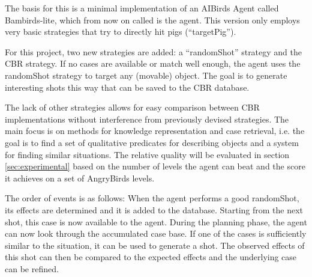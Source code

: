 The basis for this is a minimal implementation of an AIBirds Agent called Bambirds-lite, which from now on called is the agent.
This version only employs very basic strategies that try to directly hit pigs (``targetPig'').

For this project, two new strategies are added: a ``randomShot'' strategy and the CBR strategy.
If no cases are available or match well enough, the agent uses the randomShot strategy to target any (movable) object. The goal is to generate interesting shots this way that can be saved to the \ac{CBR} database.

The lack of other strategies allows for easy comparison between CBR implementations without interference from previously devised strategies.
The main focus is on methods for knowledge representation and case retrieval, i.e. the goal is to find a set of qualitative predicates for describing objects and a system for finding similar situations.
The relative quality will be evaluated in section \ref{sec:experimental} based on the number of levels the agent can beat and the score it achieves on a set of AngryBirds levels.

The order of events is as follows:
When the agent performs a good randomShot, its effects are determined and it is added to the database. Starting from the next shot, this case is now available to the agent.
During the planning phase, the agent can now look through the accumulated case base.
If one of the cases is sufficiently similar to the situation, it can be used to generate a shot.
The observed effects of this shot can then be compared to the expected effects and the underlying case can be refined.
